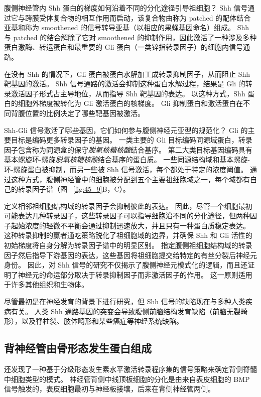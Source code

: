 腹侧神经管内 Shh 蛋白的梯度如何沿着不同的分化途径引导祖细胞？
Shh 信号通过它与跨膜受体复合物的相互作用而启动，该复合物由称为 patched 的配体结合亚基和称为 smoothened 的信号转导亚基（以相应的果蝇基因命名）组成。
Shh 与 patched 的结合解除了它对 smoothened 的抑制作用，因此激活了一种涉及多种蛋白激酶、转运蛋白和最重要的 Gli 蛋白（一类锌指转录因子）的细胞内信号通路。


在没有 Shh 的情况下，Gli 蛋白被蛋白水解加工成转录抑制因子，从而阻止 Shh 靶基因的激活。
Shh 信号通路的激活会抑制这种蛋白水解过程，结果是 Gli 的转录激活因子形式占主导地位，从而指导 Shh 靶基因的表达。
以这种方式，Shh 蛋白的细胞外梯度被转化为 Gli 激活蛋白的核梯度。
Gli 抑制蛋白和激活蛋白在不同背腹位置的比例决定了哪些靶基因被激活。


Shh-Gli 信号激活了哪些基因，它们如何参与腹侧神经元亚型的规范化？
Gli 的主要目标是编码更多转录因子的基因。
一类主要的 Gli 目标编码同源域蛋白，转录因子包含称为同源盒的保守\textit{脱氧核糖核酸}结合基序。
第二大类目标基因编码具有基本螺旋环-螺旋\textit{脱氧核糖核酸}结合基序的蛋白质。
一些同源结构域和基本螺旋-环-螺旋蛋白被抑制，而另一些被 Shh 信号激活，每个都处于特定的浓度阈值。
通过这种方式，腹侧神经管中的细胞被分配到五个主要祖细胞域之一，每个域都有自己的转录因子谱（图 ~\ref{fig:45_9}B，C）。


定义相邻祖细胞结构域的转录因子会抑制彼此的表达。
因此，尽管一个细胞最初可能表达几种转录因子，这些转录因子可以指导细胞沿不同的分化途径，但两种因子起始浓度的轻微不平衡会通过抑制迅速放大，并且只有一种蛋白质稳定表达。
这种转录抑制的赢者通吃策略锐化了祖细胞域的边界，并确保 Shh 和 Gli 活性的初始梯度将自身分解为转录因子谱中的明显区别。
指定腹侧祖细胞结构域的转录因子然后指导下游基因的表达，这些基因将祖细胞提交给特定的有丝分裂后神经元身份。
因此，对 Shh 信号的研究不仅揭示了腹侧神经元模式化的逻辑，而且还证明了神经元的命运部分取决于转录抑制因子而非激活因子的作用。
这一原则适用于许多其他组织和生物体。


尽管最初是在神经发育的背景下进行研究，但 Shh 信号的缺陷现在与多种人类疾病有关。
人类 Shh 通路基因的突变会导致腹侧前脑结构发育缺陷（前脑无裂畸形），以及脊柱裂、肢体畸形和某些癌症等神经系统缺陷。



\subsection{背神经管由骨形态发生蛋白组成}

还发现了一种基于分级形态发生素水平激活转录程序集的信号策略来确定背侧脊髓中细胞类型的模式。
神经管背侧中线顶板细胞的分化是由来自表皮细胞的 BMP 信号触发的，表皮细胞最初与神经板接壤，后来在背侧神经管两侧。


